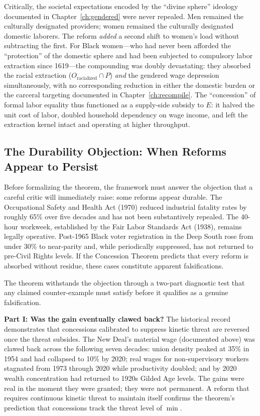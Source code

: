 \begin{enumerate}
    Critically, the societal expectations encoded by the ``divine sphere'' ideology documented in Chapter~\ref{ch:gendered} were never repealed. Men remained the culturally designated providers; women remained the culturally designated domestic laborers. The reform \textit{added} a second shift to women's load without subtracting the first. For Black women---who had never been afforded the ``protection'' of the domestic sphere and had been subjected to compulsory labor extraction since 1619---the compounding was doubly devastating: they absorbed the racial extraction ($O_{\text{racialized}} \cap P$) \textit{and} the gendered wage depression simultaneously, with no corresponding reduction in either the domestic burden or the carceral targeting documented in Chapter~\ref{ch:recompile}. The ``concession'' of formal labor equality thus functioned as a supply-side subsidy to $E$: it halved the unit cost of labor, doubled household dependency on wage income, and left the extraction kernel intact and operating at higher throughput.
\end{enumerate}

\subsection{The Durability Objection: When Reforms Appear to Persist}

Before formalizing the theorem, the framework must answer the objection that a careful critic will immediately raise: some reforms appear durable. The Occupational Safety and Health Act (1970) reduced industrial fatality rates by roughly 65\% over five decades and has not been substantively repealed. The 40-hour workweek, established by the Fair Labor Standards Act (1938), remains legally operative. Post-1965 Black voter registration in the Deep South rose from under 30\% to near-parity and, while periodically suppressed, has not returned to pre-Civil Rights levels. If the Concession Theorem predicts that every reform is absorbed without residue, these cases constitute apparent falsifications.

The theorem withstands the objection through a two-part diagnostic test that any claimed counter-example must satisfy before it qualifies as a genuine falsification.

\textbf{Part I: Was the gain eventually clawed back?} The historical record demonstrates that concessions calibrated to suppress kinetic threat are reversed once the threat subsides. The New Deal's material wage (documented above) was clawed back across the following seven decades: union density peaked at 35\% in 1954 and had collapsed to 10\% by 2020; real wages for non-supervisory workers stagnated from 1973 through 2020 while productivity doubled; and by 2020 wealth concentration had returned to 1920s Gilded Age levels. The gains were real in the moment they were granted; they were not permanent. A reform that requires continuous kinetic threat to maintain itself confirms the theorem's prediction that concessions track the threat level of $\min$.

